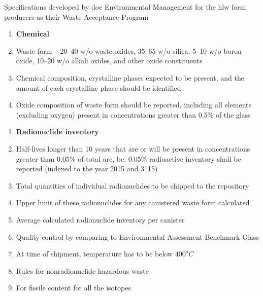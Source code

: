 \documentclass[aspectratio=1610,pdftex,dvipsnames,compress,xcolor={dvipsnames}]{beamer}
\newcommand{\acs}{\acrshort} %
\begin{document}
\begin{frame}{Specifications developed by \acs{doe} Environmental Management for the \acs{hlw} form producers as their Waste Acceptance Program}
    \begin{enumerate}[series=outerlist,topsep=0pt,itemsep=7pt,leftmargin=*,label=(\arabic*)]
        \item[]\textbf{Chemical}
        \item[]Waste form -- 20--40 w/o waste oxides, 35--65 w/o silica, 5--10 w/o boron oxide, 10--20 w/o alkali oxides, and other oxide constituents
        \item[]Chemical composition, crystalline phases expected to be present, and the amount of each crystalline phase should be identified
        \item[]Oxide composition of waste form should be reported, including all elements (excluding oxygen) present in concentrations greater than 0.5\% of the glass
    \end{enumerate}
\end{frame}


\begin{frame}[t]{}
    \begin{enumerate}[series=outerlist,topsep=0pt,itemsep=7pt,leftmargin=*,label=(\arabic*)]
        \item[]\textbf{Radionuclide inventory}
        \item[]Half-lives longer than 10 years that are or will be present in concentrations greater than 0.05\% of total are, be, 0.05\% radioactive inventory shall be reported (indexed to the year 2015 and 3115)
        \item[]Total quantities of individual radionuclides to be shipped to the repository
        \item[]Upper limit of these radionuclides for any canistered waste form calculated
        \item[]Average calculated radionuclide inventory per canister
        \item[]Quality control by comparing to Environmental Assessment Benchmark Glass
        \item[]At time of shipment, temperature has to be below $400^oC$
        \item[]Rules for nonradionuclide hazardous waste
        \item[]For fissile content for all the isotopes
    \end{enumerate}
\end{frame}
\end{document}
